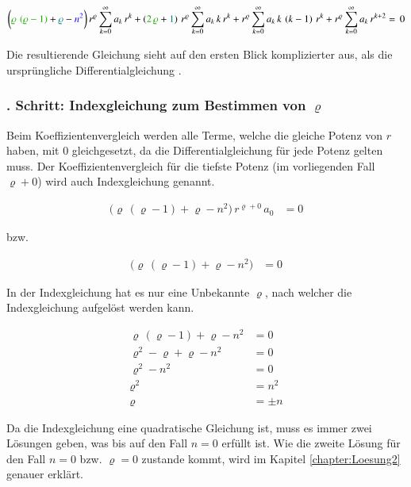 \begin{align}
	\biggl(
	\textcolor{mygreen}{\varrho \, \left( \varrho - 1 \right)}
	+ 
	\textcolor{teal}{\varrho}
	-
	\textcolor{blue}{n^2}
	\biggr)
	\, r^{\varrho}
	\sum_{k=0}^{\infty} a_k \, r^k
	+ 
	\left(	
	\textcolor{mygreen}{2 \, \varrho}
	+
	\textcolor{teal}{1}
	\right)
	\, r^{\varrho}
	\sum_{k=0}^{\infty} a_k \, k \, r^k
	+
	r^{\varrho}
	\sum_{k=0}^{\infty} a_k \, k \, \left( k - 1 \right) \, r^k
	+ 
	r^{\varrho}
	\sum_{k=0}^{\infty} a_k \, r^{k + 2}
	= \, 0
	\label{eq:bessel:potenzreihe:dgl:vereinfacht}
\end{align}
\begin{normalsize}%
Die resultierende Gleichung  sieht auf den ersten Blick komplizierter aus,
als die urspr\"ungliche Differentialgleichung .
\end{normalsize}
\subsubsection{. Schritt: Indexgleichung zum Bestimmen von $\varrho$}
\begin{normalsize}%
Beim Koeffizientenvergleich werden alle Terme,
welche die gleiche Potenz von $r$ haben,
mit $0$ gleichgesetzt,
da die Differentialgleichung f\"ur jede Potenz gelten muss.
Der Koeffizientenvergleich f\"ur die tiefste Potenz (im vorliegenden Fall $\varrho + 0$) wird auch Indexgleichung genannt.
\end{normalsize}
\begin{align}
	\big( \varrho \, \left( \varrho -1 \right) + \varrho - n^2 \big)
	\, r^{\varrho + 0} \, a_0 &= 0
	\label{eq:bessel:indexgleichung:ausgangslage}
\end{align}
\begin{normalsize}%
\acs{bzw.}
\end{normalsize}
\begin{align}
	\big( \varrho \, \left( \varrho -1 \right) + \varrho - n^2 \big) &= 0
	\label{eq:bessel:indexgleichung:ausgangslage:vereinfacht}
\end{align}
\begin{normalsize}%
In der Indexgleichung  hat es nur eine Unbekannte $\varrho$,
nach welcher die Indexgleichung aufgel\"ost werden kann.
\end{normalsize}
\begin{align*}
	\varrho \, \left( \varrho -1 \right) + \varrho - n^2 &= 0 \\
	\varrho ^2 - \varrho + \varrho -n^2 &= 0  \\
	\varrho ^2 - n^2 &= 0 \\
	\varrho ^2 &= n^2 \\
	\varrho &= \pm n
\end{align*}
\begin{normalsize}%
Da die Indexgleichung eine quadratische Gleichung ist,
muss es immer zwei L\"osungen geben,
was bis auf den Fall $n = 0$ erf\"ullt ist.
Wie die zweite L\"osung f\"ur den Fall $n = 0$ \acs{bzw.} $\varrho = 0$ zustande kommt,
wird im Kapitel \ref{chapter:Loesung2} genauer erkl\"art.
\end{normalsize}
